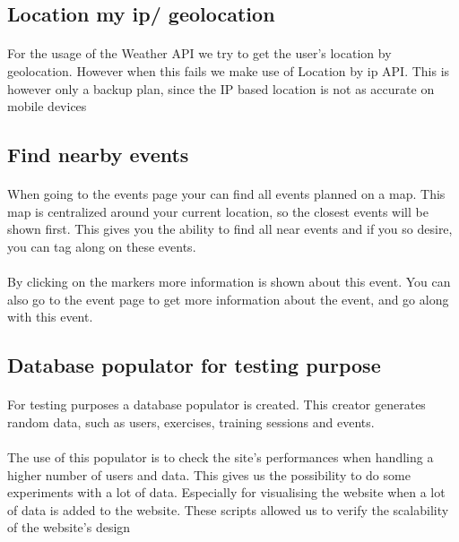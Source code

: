 \documentclass[11pt,a4paper]{scrartcl}
\begin{document}
\subsection{Location my ip/ geolocation}
\paragraph{}For the usage of the Weather API we try to get the user's location by geolocation. However when this fails we make use of Location by ip API. This is however only a backup plan, since the IP based location is not as accurate on mobile devices
\subsection{Find nearby events}
\paragraph{}When going to the events page your can find all events planned on a map. This map is centralized around your current location, so the closest events will be shown first. This gives you the ability to find all near events and if you so desire, you can tag along on these events.
\paragraph{}By clicking on the markers more information is shown about this event. You can also go to the event page to get more information about the event, and go along with this event.
\subsection{Database populator for testing purpose}
\paragraph{}For testing purposes a database populator is created. This creator generates random data, such as users, exercises, training sessions and events.
\paragraph{}The use of this populator is to check the site's performances when handling a higher number of users and data. This gives us the possibility to do some experiments with a lot of data. Especially for visualising the website when a lot of data is added to the website. These scripts allowed us to verify the scalability of the website's design
\end{document}
